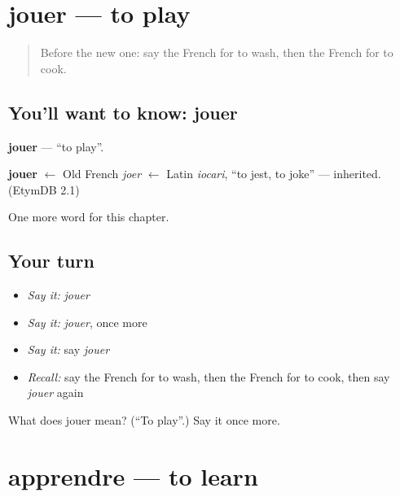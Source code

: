\section[jouer]{jouer — to play}

\label{lesson:FR-C60-jouer}



\begin{quote}
Before the new one: say the French for to wash, then the French for to cook.
\end{quote}

\subsection*{You'll want to know: jouer}
\textbf{jouer} — \textquotedblleft{}to play\textquotedblright{}.

\begin{cousinweb}
\textbf{jouer} $\leftarrow$ Old French \emph{joer} $\leftarrow$ Latin \emph{iocari}, \textquotedblleft{}to jest, to joke\textquotedblright{} — inherited. (EtymDB 2.1)
\end{cousinweb}

\begin{grammarlens}[title={What you've built}]
One more word for this chapter.
\end{grammarlens}

\subsection*{Your turn}
\begin{itemize}
\raggedright
  \item \emph{Say it:} \emph{jouer}
  \item \emph{Say it:} \emph{jouer}, once more
  \item \emph{Say it:} say \emph{jouer}
  \item \emph{Recall:} say the French for to wash, then the French for to cook, then say \emph{jouer} again
\end{itemize}

\begin{tcolorbox}[breakable,colback=teal!4,colframe=teal!35!black,title={Before you move on}]
What does jouer mean? (\textquotedblleft{}To play\textquotedblright{}.) Say it once more.
\end{tcolorbox}
\section[apprendre]{apprendre — to learn}

